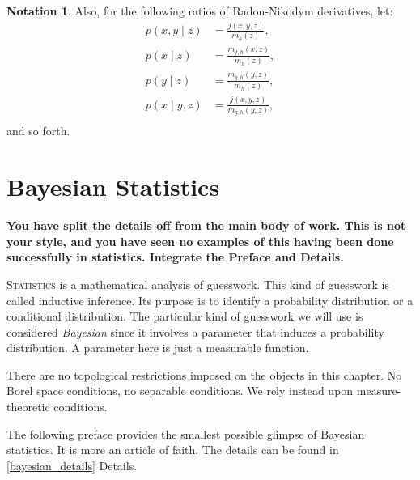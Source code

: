\documentclass[
twoside=true,
paper=letter,
fontsize=9pt,
pagesize=auto,
leqno,
openany,
headsepline,
overfullrule,
]{scrbook}
\theoremstyle{plain}
\theoremstyle{plain}
\theoremstyle{definition}
\newtheorem{notn}[thm]{Notation}
\theoremstyle{bfnoteitalic}
\theoremstyle{bfnoteroman}
\newcommand{\function}{f}
\newcommand{\functionii}{g}
\newcommand{\functioniii}{h}
\newcommand{\mspaceelt}{x}
\newcommand{\mspaceeltii}{y}
\newcommand{\mspaceeltiii}{z}
\begin{document}
\begin{notn}
Also, for the following ratios of Radon-Nikodym derivatives, let:
\begin{align*}
p(\mspaceelt,\mspaceeltii\mid\mspaceeltiii)
& =
\frac{j(\mspaceelt,\mspaceeltii,\mspaceeltiii)}
{m_{\functioniii} (\mspaceeltiii)},
\\
p(\mspaceelt\mid\mspaceeltiii)
& =
\frac{m_{\function,\functioniii}(\mspaceelt,\mspaceeltiii)}
{m_{\functioniii} (\mspaceeltiii)},
\\
p(\mspaceeltii\mid\mspaceeltiii)
& =
\frac{m_{\functionii,\functioniii}(\mspaceeltii,\mspaceeltiii)}
{m_{\functioniii} (\mspaceeltiii)},
\\
p(\mspaceelt\mid \mspaceeltii,\mspaceeltiii)
& =
\frac{ j( \mspaceelt, \mspaceeltii, \mspaceeltiii) }
{m_{\functionii, \functioniii} ( \mspaceeltii,\mspaceeltiii ) },
\\
\end{align*}
and so forth.
\end{notn}




\chapter{Bayesian Statistics}\label{bayesian_statistics}
\textbf{You have split the details off from the main body of work.  This is not your style, and you have seen no examples of this having been done successfully in statistics.  Integrate the Preface and Details.}

\lettrine{S}{tatistics} is a mathematical analysis of guesswork. This kind of guesswork is called inductive inference.
Its purpose is to identify a probability distribution or a conditional distribution. The particular kind of guesswork we will use is considered \emph{Bayesian} since it involves a parameter that induces a  probability distribution. A parameter here is just a measurable function.

There are no topological restrictions imposed on the objects in this chapter. No Borel space conditions, no separable conditions.  We rely instead upon measure-theoretic conditions.

The following preface provides the smallest possible glimpse of Bayesian statistics. It is more an article of faith.
The details can be found in \textsf{\ref{bayesian_details} Details}.
\end{document}
